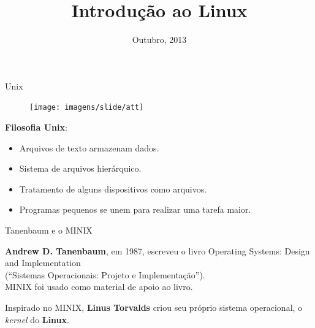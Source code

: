 \documentclass[size=14pt,
style=paintings
]{powerdot}
\title{Introdução ao Linux}
\date{Outubro, 2013}
\newenvironment{vslide}{\vspace{\stretch{1}}}{\vspace{\stretch{1}}}
\begin{document}
\maketitle

\begin{slide}{Unix}
{
   \begin{figure}[!h]
  \texttt{[image: imagens/slide/att]}
   \end{figure}
}

\textbf{Filosofia Unix}:
\begin{itemize}
\item Arquivos de texto armazenam dados.
\item Sistema de arquivos hierárquico.
\item Tratamento de alguns dispositivos como arquivos.
\item Programas pequenos se unem para realizar uma tarefa maior.
\end{itemize}
\end{slide}

\begin{slide}{Tanenbaum e o MINIX}

\begin{vslide}
\textbf{Andrew D. Tanenbaum}, em 1987, escreveu o livro {\color{blue}Operating Systems: Design and Implementation}\\ (``Sistemas Operacionais: Projeto e Implementação'').
\\
\vspace{.5cm}
MINIX foi usado como material de apoio ao livro.

\vspace{0.5cm}
Inspirado no MINIX, \textbf{Linus Torvalds} criou seu próprio sistema operacional, o \textit{kernel} do \textbf{Linux}.
\vspace{0.5cm}
\end{vslide}

\end{slide}
\end{document}
